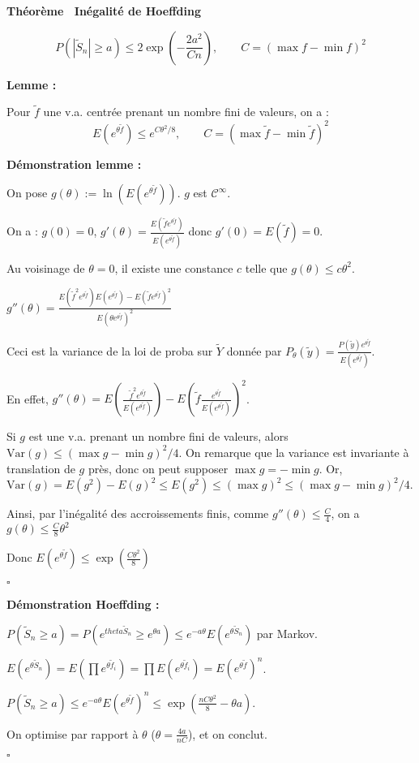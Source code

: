 \documentclass[10pt,a4paper,notitlepage ]{report}
\newcommand{\1}{\mathds 1}
\newcommand{\var}{\mathrm{Var}}
\newcounter{th}
\newenvironment{theorem}[1][]{
\refstepcounter{th}
\begin{tcolorbox}
	\textbf{Théorème \theth \ #1}
	
	
}{\end{tcolorbox}}
\newenvironment{demo}[1][]{

	\textbf{Démonstration #1 :}
}{\begin{flushright}
	$\square$
\end{flushright}
}
\newenvironment{lemme}[1][]{
	\begin{tcolorbox}
		\textbf{Lemme #1 : }
	}
	{\end{tcolorbox}}
\begin{document}
\begin{theorem}[Inégalité de Hoeffding]
	\[ P\left( \left| \tilde S_n \right| \ge a \right) \le 2 \exp (-\frac{2a^2}{Cn}), \qquad C = (\max f - \min f)^2\]
\end{theorem}

\begin{lemme}
	Pour $\tilde f$ une v.a. centrée prenant un nombre fini de valeurs, on a : 
	\[ E\left( e^{\theta \tilde f} \right) \le e^{C\theta^2/8}, \qquad C=(\max \tilde f - \min \tilde f)^2\]
\end{lemme}

\begin{demo}[lemme]
	On pose $g(\theta):=\ln(E(e^{\theta\tilde f}))$. $g$ est $\mathcal C^\infty$.
	
	On a : $g(0) = 0$, $g'(\theta) = \frac{E(\tilde f e^{\theta\tilde f})}{E(e^{\theta \tilde f})}$ donc $g'(0) = E(\tilde f) = 0$.
	
	Au voisinage de $\theta = 0$, il existe une constance $c$ telle que $g(\theta) \le c\theta^2$.
	
	$g''(\theta) = \frac{E(\tilde f^2 e^{\theta \tilde f}) E(e^{\theta\tilde f}) - E(\tilde f e^{\theta\tilde f})^2} {E(\theta e^{\theta\tilde f})^2}$
	
	Ceci est la variance de la loi de proba sur $\tilde Y$ donnée par $P_\theta(\tilde y) = \frac{P(\tilde y)e^{\theta\tilde f}}{E(e^{\theta \tilde f})}$.
	
	En effet, $g''(\theta) = E \left(  \frac{\tilde f^2 e^{\theta\tilde f}} {E(e^{\theta \tilde f})} \right) - E \left( \tilde f \frac{e^{\theta\tilde f}}{E(e^{\theta\tilde f})} \right)^2$.
	
	Si $g$ est une v.a. prenant un nombre fini de valeurs, alors $\var(g) \le (\max g - \min g)^2/4$. On remarque que la variance est invariante à translation de $g$ près, donc on peut supposer $\max g = - \min g$. Or, $\var(g) = E(g^2) - E(g)^2 \le E(g^2) \le (\max g)^2 \le (\max g - \min g)^2/4$.
	
	Ainsi, par l'inégalité des accroissements finis, comme $g''(\theta) \le \frac C 4$, on a $g(\theta) \le \frac C 8 \theta^2$
	
	Donc $E(e^{\theta\tilde f}) \le \exp\left( \frac{C\theta^2} 8 \right)$
\end{demo}

\begin{demo}[Hoeffding]
	$P(\tilde S_n \ge a) = P(e^{theta\tilde S_n} \ge e^{\theta a}) \le e^{-a\theta}E(e^{\theta\tilde S_n})$ par Markov.
	
	$E(e^{\theta\tilde S_n}) = E(\prod e^{\theta\tilde f_i}) = \prod E(e^{\theta\tilde f_i}) = E(e^{\theta\tilde f})^n$.
	
	$P(\tilde S_n \ge a) \le e^{-a\theta} E(e^{\theta\tilde f})^n \le \exp \left(\frac {nC\theta^2} 8 - \theta a \right)$.
	
	On optimise par rapport à $\theta$ ($\theta = \frac{4a}{nC}$), et on conclut.
\end{demo}
\end{document}
